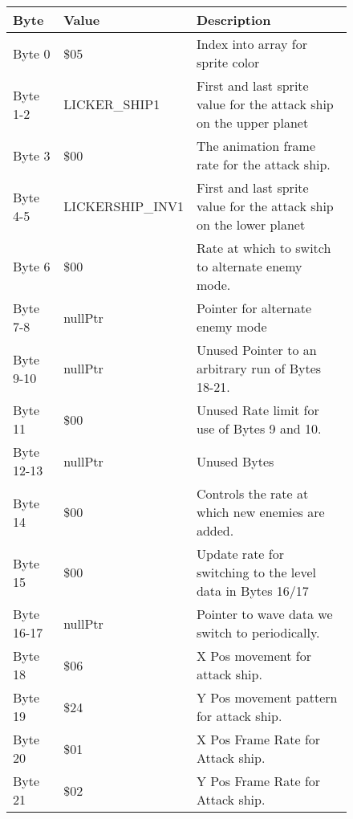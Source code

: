 \begin{figure}[H]
{\begin{adjustbox}{width=12cm}
\begin{tabular}{lll}
\toprule
 Byte       & Value                     & Description                                                         \\
\midrule
 Byte 0     & \$05                       & Index into array for sprite color                                   \\
 Byte 1-2   & LICKER\_SHIP1              & First and last sprite value for the attack ship on the upper planet \\
 Byte 3     & \$00                       & The animation frame rate for the attack ship.                       \\
 Byte 4-5   & LICKERSHIP\_INV1           & First and last sprite value for the attack ship on the lower planet \\
 Byte 6     & \$00                       & Rate at which to switch to alternate enemy mode.                    \\
 Byte 7-8   & nullPtr                   & Pointer for alternate enemy mode                                    \\
 Byte 9-10  & nullPtr                   & Unused Pointer to an arbitrary run of Bytes 18-21.                  \\
 Byte 11    & \$00                       & Unused Rate limit for use of Bytes 9 and 10.                        \\
 Byte 12-13 & nullPtr                   & Unused Bytes                                                        \\
 Byte 14    & \$00                       & Controls the rate at which new enemies are added.                   \\
 Byte 15    & \$00                       & Update rate for switching to the level data in Bytes 16/17          \\
 Byte 16-17 & nullPtr                   & Pointer to wave data we switch to periodically.                     \\
 Byte 18    & \$06                       & X Pos movement for attack ship.                                     \\
 Byte 19    & \$24                       & Y Pos movement pattern for attack ship.                             \\
 Byte 20    & \$01                       & X Pos Frame Rate for Attack ship.                                   \\
 Byte 21    & \$02                       & Y Pos Frame Rate for Attack ship.                                   \\

\end{tabular}
\end{adjustbox}}
\end{figure}
